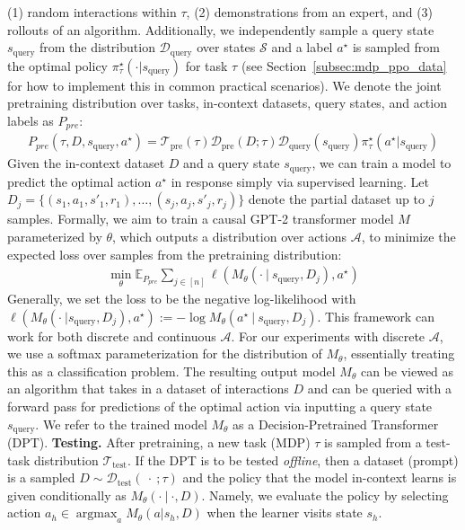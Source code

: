 \documentclass{article}
\newcommand{\Acal}{\mathcal{A}}
\newcommand{\Dcal}{\mathcal{D}}
\newcommand{\Scal}{{\mathcal{S}}}
\newcommand{\Tcal}{{\mathcal{T}}}
\newcommand{\E}{\mathbb{E}}
\newcommand*{\argmax}{\mathop{\mathrm{argmax}}}
\newcommand{\pretraind}{\Dcal_{\text{pre}}}
\newcommand{\pretraint}{\Tcal_{\text{pre}}}
\newcommand{\testt}{\Tcal_{\text{test}}}
\newcommand{\testd}{\Dcal_{\text{test}}}
\newcommand{\squery}{s_{\text{query}}}
\newcommand{\Dquery}{\Dcal_{\text{query}}}
\newcommand{\pistar}{\pi^{\star}}
\begin{document}
   (1) random interactions within $\tau$,
    (2) demonstrations from an expert,
     and (3) rollouts of an algorithm.
Additionally, we independently sample a query state $\squery$ from the distribution $\Dquery$ over states $\Scal$ and a label $a^\star$ is sampled from the optimal policy $\pistar_\tau(\cdot | \squery)$
for task $\tau$ (see Section~\ref{subsec:mdp_ppo_data} for how to implement this in common practical scenarios).
 We denote the joint pretraining distribution over tasks, in-context datasets,  query states, and action labels as $P_{pre}$:
\begin{align}
    P_{pre}(\tau, D, \squery, a^\star) = \pretraint(\tau) \pretraind( D; \tau) \Dquery(\squery ) \pistar_\tau( a^\star | \squery)
\end{align}
Given the
in-context dataset $D$ and a query state $\squery$, we can train a model to predict the optimal action $a^\star$ in response simply via supervised learning. Let $D_j = \{ (s_1, a_1, s'_1, r_1), \ldots, (s_j, a_j, s'_j, r_j) \}$ denote the partial dataset up to $j$ samples. Formally, we aim to train a causal GPT-2 transformer model $M$ parameterized by $\theta$, which outputs a distribution over actions $\Acal$, to minimize the expected loss over samples from the pretraining distribution:
\begin{align}\label{eq:pretrain-obj}
{\textstyle \min_{\theta}  \E_{P_{pre}}  \sum_{j \in [n]} \ell \left( M_{\theta} (  \cdot \ | \ \squery, D_j), a^\star \right)}
\end{align}
Generally, we set the loss to be the negative log-likelihood with $\ell( M_{\theta}( \cdot \ | \squery, D_j), a^\star)  := -\log M_{\theta}(a^\star \ | \ \squery, D_j)$. This framework can work for both discrete and continuous $\Acal$. For our experiments with discrete $\Acal$, we use a softmax parameterization for the distribution of $M_{\theta}$, essentially treating this as a classification problem.
The resulting output model $M_{\theta}$ can be viewed as an algorithm that takes in a dataset of interactions $D$ and can be queried with a forward pass for predictions of the optimal action via inputting a query state $\squery$. We refer to the trained model $M_{\theta}$ as a Decision-Pretrained Transformer (DPT).
\textbf{Testing.}
After pretraining, a new task (MDP) $\tau$ is sampled from a test-task distribution $\testt$. If the DPT is to be tested \emph{offline}, then a dataset (prompt) is a sampled $D \sim \testd(\ \cdot \ ; \tau)$ and the policy that the model in-context learns is given conditionally as $M_{\theta}(\cdot \ | \ \cdot, D)$. Namely, we evaluate the policy by selecting action $a_h \in \argmax_{a} M_{\theta}(a | s_h, D)$ when the learner visits state $s_h$.
\end{document}
